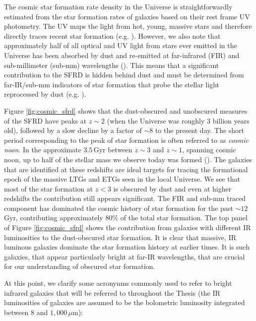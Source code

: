 The cosmic star formation rate density in the Universe is straightforwardly estimated from the star formation rates of galaxies based on their rest frame UV photometry. The UV maps the light from hot, young, massive stars and therefore directly traces recent star formation (e.g. \citealt{Madau_1996, Lilly_1996, Wyder_2005, Schiminovich_2005, Dahlen_2007, Reddy_2009, Robotham_2011, Cucciati_2012, Schenker_2013, Finkelstein_2015}). However, we also note that approximately half of all optical and UV light from stars ever emitted in the Universe has been absorbed by dust and re-emitted at far-infrared (FIR) and sub-millimeter (sub-mm) wavelengths (\citealt{Puget_1996, Fixsen_1998, Dole_2006, Driver_2008, Driver_2016}). This means that a significant contribution to the SFRD is hidden behind dust and must be determined from far-IR/sub-mm indicators of star formation that probe the stellar light reprocessed by dust (e.g. \citealt{Magnelli_2011, Casey_2012, Magnelli_2013, Gruppioni_2013, Swinbank_2014, Bouwens_2016, Bourne_2017, Koprowski_2017, Novak_2017, Liu_2018, Bouwens_2020, Dudzeviciute_2020}).

Figure \ref{fig:cosmic_sfrd} shows that the dust-obscured and unobscured measures of the SFRD have peaks at $z\sim2$ (when the Universe was roughly $3$ billion years old), followed by a slow decline by a factor of $\sim 8$ to the present day. The short period corresponding to the peak of star formation is often referred to as \textit{cosmic noon}. In the approximate $3.5\,$Gyr between $z\sim3$ and $z\sim1$, spanning cosmic noon, up to half of the stellar mass we observe today was formed (\citealt{Forster-Schreiber_2020}). The galaxies that are identified at these redshifts are ideal targets for tracing the formational epoch of the massive LTGs and ETGs seen in the local Universe. We see that most of the star formation at $z < 3$ is obscured by dust and even at higher redshifts the contribution still appears significant. The FIR and sub-mm traced component has dominated the cosmic history of star formation for the past $\sim 12\,$Gyr, contributing approximately $80\%$ of the total star formation. The top panel of Figure \ref{fig:cosmic_sfrd} shows the contribution from galaxies with different IR luminosities to the dust-obscured star formation. It is clear that massive, IR luminous galaxies dominate the star formation history at earlier times. It is such galaxies, that appear particularly bright at far-IR wavelengths, that are crucial for our understanding of obscured star formation. 

At this point, we clarify some acronynms commonly used to refer to bright infrared galaxies that will be referred to throughout the Thesis (the IR luminosities of galaxies are assumed to be the bolometric luminosity integrated between $8$ and $1,000\,\mu$m):


